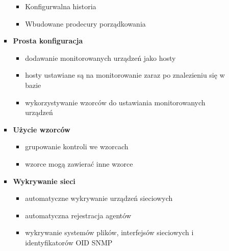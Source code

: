 \documentclass[12pt]{article}
\renewcommand{\_}{\kern-1.5pt\textunderscore\kern-1.5pt}
\begin{document}
\begin{itemize}
\begin{itemize}
\begin{itemize}
\begin{itemize}
	\item Konfigurwalna historia\par

	\item Wbudowane prodecury porządkowania\par


\end{itemize}
	\item \textbf{Prosta konfiguracja}\par

\setlength{\parskip}{5.04pt}
\begin{itemize}
	\item dodawanie monitorowanych urządzeń jako hosty\par

	\item hosty ustawiane są na monitorowanie zaraz po znalezieniu się w bazie\par

	\item wykorzystywanie wzorców do ustawiania monitorowanych urządzeń\par


\end{itemize}
	\item \textbf{Użycie wzorców}\par

\begin{itemize}
	\item grupowanie kontroli we wzorcach\par

	\item wzorce mogą zawierać inne wzorce\par


\end{itemize}
	\item \textbf{Wykrywanie sieci}\par

\begin{itemize}
	\item automatyczne wykrywanie urządzeń sieciowych\par

	\item automatyczna rejestracja agentów\par

	\item wykrywanie systemów plików, interfejsów sieciowych i identyfikatorów OID SNMP\par



\end{itemize}
\end{itemize}
\end{itemize}
\end{itemize}
\end{document}
